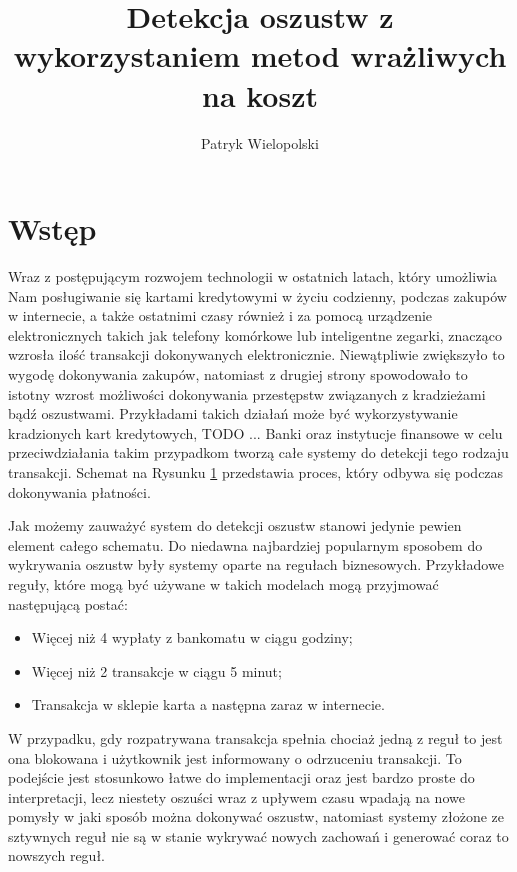 \documentclass{book}
\title{Detekcja oszustw z wykorzystaniem metod wrażliwych na koszt}
\author{Patryk Wielopolski}
\begin{document}
	
	\newcommand{\htx}{h_{\theta}(\boldsymbol{x_i})}
	\newcommand{\es}{\mathcal{S}}
	\newcommand{\ef}{\mathcal{F}}
	\newcommand{\iks}{\boldsymbol{x}}
	\newcommand{\bes}{\boldsymbol{S}}
	\newcommand{\yht}[1]{y_i^{(#1)}}
	\newcommand{\ylab}[2]{\text{#1}_{\text{#2}}}
	
	\newenvironment{talign}
	{\align}
	{\endalign}
	
	\newenvironment{talign*}
	{\csname align*\endcsname}
	{\endalign}

\maketitle

\chapter{Wstęp}
	Wraz z postępującym rozwojem technologii w ostatnich latach, który umożliwia Nam posługiwanie się kartami kredytowymi w życiu codzienny, podczas zakupów w internecie, a także ostatnimi czasy również i za pomocą urządzenie elektronicznych takich jak telefony komórkowe lub inteligentne zegarki, znacząco wzrosła ilość transakcji dokonywanych elektronicznie. Niewątpliwie zwiększyło to wygodę dokonywania zakupów, natomiast z drugiej strony spowodowało to istotny wzrost możliwości dokonywania przestępstw związanych z kradzieżami bądź oszustwami. Przykładami takich działań może być wykorzystywanie kradzionych kart kredytowych, TODO ... 
	Banki oraz instytucje finansowe w celu przeciwdziałania takim przypadkom tworzą całe systemy do detekcji tego rodzaju transakcji. Schemat na Rysunku \ref{} przedstawia proces, który odbywa się podczas dokonywania płatności. 
	
	Jak możemy zauważyć system do detekcji oszustw stanowi jedynie pewien element całego schematu. Do niedawna najbardziej popularnym sposobem do wykrywania oszustw były systemy oparte na regułach biznesowych. Przykładowe reguły, które mogą być używane w takich modelach mogą przyjmować następującą postać:
	\begin{itemize}
		\item Więcej niż 4 wypłaty z bankomatu w ciągu godziny;
		\item Więcej niż 2 transakcje w ciągu 5 minut;
		\item Transakcja w sklepie karta a następna zaraz w internecie.
	\end{itemize}
	W przypadku, gdy rozpatrywana transakcja spełnia chociaż jedną z reguł to jest ona blokowana i użytkownik jest informowany o odrzuceniu transakcji. To podejście jest stosunkowo łatwe do implementacji oraz jest bardzo proste do interpretacji, lecz niestety oszuści wraz z upływem czasu wpadają na nowe pomysły w jaki sposób można dokonywać oszustw, natomiast systemy złożone ze sztywnych reguł nie są w stanie wykrywać nowych zachowań i generować coraz to nowszych reguł.
	
\end{document}
